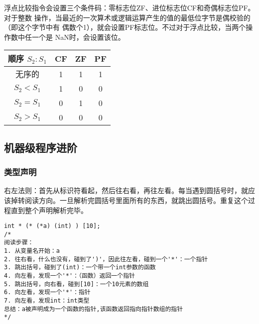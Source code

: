 浮点比较指令会设置三个条件码：零标志位ZF、进位标志位CF和奇偶标志位PF。对于整数
操作，当最近的一次算术或逻辑运算产生的值的最低位字节是偶校验的（即这个字节中有
偶数个1），就会设置PF标志位。不过对于浮点比较，当两个操作数中任一个是
NaN时，会设置该位。
\begin{table}[H]
    \centering
    \begin{tabular}{|c|c|c|c|}
        \hline
        顺序 $S_2:S_1$ & CF & ZF & PF \\
        \hline
        无序的          & 1  & 1  & 1  \\
        \hline
        $S_2 < S_1$  & 1  & 0  & 0  \\
        \hline
        $S_2 = S_1$  & 0  & 1  & 0  \\
        \hline
        $S_2 > S_1$  & 0  & 0  & 0  \\
        \hline
    \end{tabular}
\end{table}


\subsection{机器级程序进阶}
\subsubsection{类型声明}

右左法则：首先从标识符看起，然后往右看，再往左看。每当遇到圆括号时，就应该掉转阅读方向。一旦解析完圆括号里面所有的东西，就跳出圆括号。重复这个过程直到整个声明解析完毕。
\begin{lstlisting}[style=CStyle]
int * (* (*a) (int) ) [10];
/*
阅读步骤：
1. 从变量名开始：a
2. 往右看，什么也没有，碰到了')'，因此往左看，碰到一个'*'：一个指针
3. 跳出括号，碰到了(int)：一个带一个int参数的函数
4. 向左看，发现一个'*'：（函数）返回一个指针
5. 跳出括号，向右看，碰到[10]：一个10元素的数组
6. 向左看，发现一个'*'：指针
7. 向左看，发现int：int类型
总结：a被声明成为一个函数的指针,该函数返回指向指针数组的指针
*/
\end{lstlisting}



\newpage
